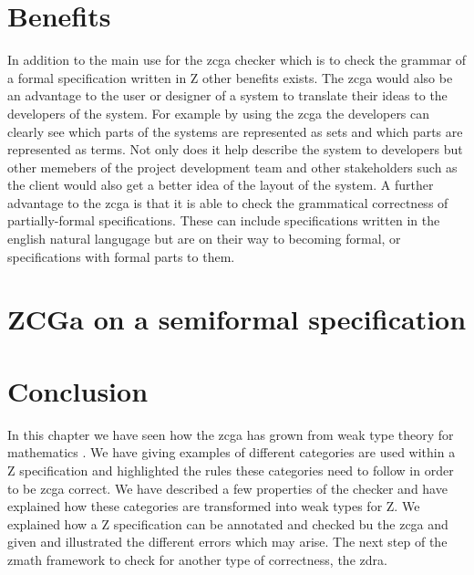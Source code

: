 \section{Benefits}

In addition to the main use for the \gls{zcga} checker which is to check the grammar of a formal specification written in Z other benefits exists. The \gls{zcga} would also be an advantage to the user or designer of a system to translate their ideas to the developers of the system. For example by using the \gls{zcga} the developers can clearly see which parts of the systems are represented as sets and which parts are represented as terms. Not only does it help describe the system to developers but other memebers of the project development team and other stakeholders such as the client would also get a better idea of the layout of the system.
A further advantage to the \gls{zcga} is that it is able to check the grammatical correctness of partially-formal specifications. These can include specifications written in the english natural langugage but are on their way to becoming formal, or specifications with formal parts to them.

\section{ZCGa on a semiformal specification}


\section{Conclusion}
In this chapter we have seen how the \gls{zcga} has grown from weak type theory for mathematics \cite{wtt}. We have giving examples of different categories are used within a Z specification and highlighted the rules these categories need to follow in order to be \gls{zcga} correct. We have described a few properties of the checker and have explained how these categories are transformed into weak types for Z. We explained how a Z specification can be annotated and checked bu the \gls{zcga} and given and illustrated the different errors which may arise. The next step of the \gls{zmath} framework to check for another type of correctness, the \gls{zdra}.
